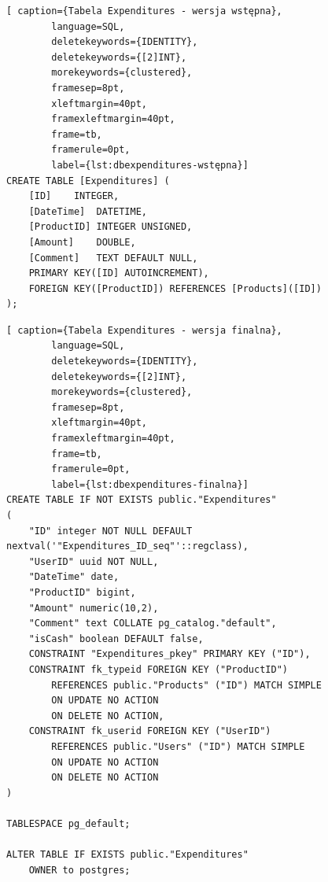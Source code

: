 \documentclass[a4paper, 10pt, twoside, openright]{report}
\begin{document}
\begin{large}
\begin{minipage}{\textwidth}
    \begin{lstlisting}[ caption={Tabela Expenditures - wersja wstępna},
        language=SQL,
        deletekeywords={IDENTITY},
        deletekeywords={[2]INT},
        morekeywords={clustered},
        framesep=8pt,
        xleftmargin=40pt,
        framexleftmargin=40pt,
        frame=tb,
        framerule=0pt,
        label={lst:dbexpenditures-wstępna}]
CREATE TABLE [Expenditures] (
    [ID]	INTEGER,
    [DateTime]	DATETIME,
    [ProductID]	INTEGER UNSIGNED,
    [Amount]	DOUBLE,
    [Comment]	TEXT DEFAULT NULL,
    PRIMARY KEY([ID] AUTOINCREMENT),
    FOREIGN KEY([ProductID]) REFERENCES [Products]([ID])
);\end{lstlisting}
\end{minipage}

\begin{minipage}{\textwidth}
    \begin{lstlisting}[ caption={Tabela Expenditures - wersja finalna},
        language=SQL,
        deletekeywords={IDENTITY},
        deletekeywords={[2]INT},
        morekeywords={clustered},
        framesep=8pt,
        xleftmargin=40pt,
        framexleftmargin=40pt,
        frame=tb,
        framerule=0pt,
        label={lst:dbexpenditures-finalna}]
CREATE TABLE IF NOT EXISTS public."Expenditures"
(
    "ID" integer NOT NULL DEFAULT nextval('"Expenditures_ID_seq"'::regclass),
    "UserID" uuid NOT NULL,
    "DateTime" date,
    "ProductID" bigint,
    "Amount" numeric(10,2),
    "Comment" text COLLATE pg_catalog."default",
    "isCash" boolean DEFAULT false,
    CONSTRAINT "Expenditures_pkey" PRIMARY KEY ("ID"),
    CONSTRAINT fk_typeid FOREIGN KEY ("ProductID")
        REFERENCES public."Products" ("ID") MATCH SIMPLE
        ON UPDATE NO ACTION
        ON DELETE NO ACTION,
    CONSTRAINT fk_userid FOREIGN KEY ("UserID")
        REFERENCES public."Users" ("ID") MATCH SIMPLE
        ON UPDATE NO ACTION
        ON DELETE NO ACTION
)

TABLESPACE pg_default;

ALTER TABLE IF EXISTS public."Expenditures"
    OWNER to postgres;\end{lstlisting}
\end{minipage}


\end{large}
\end{document}
